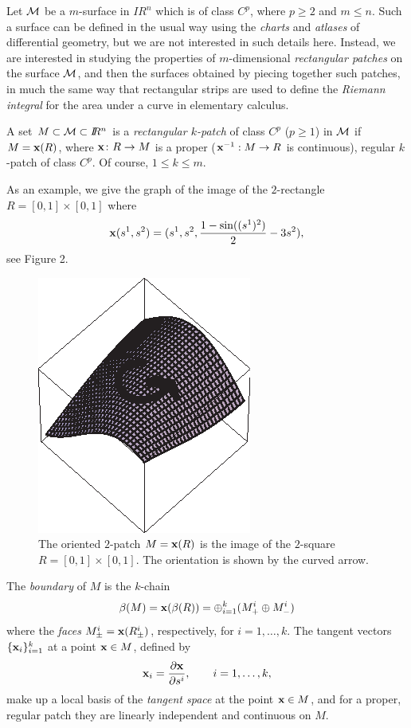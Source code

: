 \documentclass[12]{article}
\def\no{\noindent}
\def\bx{{\bf x}}
\def\R{I\!\!R}
\def\no{\noindent}
\def\no{\noindent}
\def\no{\noindent}
\def\d{\partial}
\def \xx {{\bf x}}
\begin{document}
Let $\cal M$ be a $m$-surface in $\R^n$ which is of class $C^p$, where $p\ge 2$ and $m\le n$.
Such a surface can be defined in the usual way using the
{\it charts} and {\it atlases} of differential geometry, but we are not interested in such details here.
Instead, we are interested in studying the properties of $m$-dimensional {\it rectangular patches} on
the surface $\cal M$, and then the surfaces obtained by piecing together such patches, in much the
same way that rectangular strips are used to define the {\it Riemann integral} for the
area under a curve in elementary
calculus.

\bigskip

\no {\bf Definition}
A set $M\subset {\cal M}\subset \R^n$ is a {\it rectangular $k$-patch} of class $C^p$ ($p\geq 1$) in $\cal M$ 
if $M=\xx(R)$, where $\xx\colon R\to  M$ is a proper ($\xx^{-1}:M \to R$ is continuous),
 regular $k$-patch of class $C^p$. Of course, $1\le k\le m$.

\bigskip

As an example, we give the graph of the image of the $2$-rectangle $R=[0,1]\times [0,1]$ where 
\[ \bx(s^1,s^2)=(s^1,s^2,\frac{1- \sin((s^1)^2)}{2}-3s^2), \] 
see Figure 2.

\begin{figure}
\begin{center}
\includegraphics[scale=1.40]{fig2c.eps}%
\caption{The oriented $2$-patch $M=\bx(R)$ is the image of the $2$-square $R=[0,1]\times [0,1]$. The
orientation is shown by the curved arrow.}
\end{center}
\end{figure} 

The {\it boundary} of $M$ is the $k$-chain 
\begin{displaymath}
\beta(M) =\xx(\beta(R))= \oplus_{i=1}^k (M^i_+ \oplus M^i_-)
\end{displaymath}
where the {\it faces} $M^i_\pm=\xx(R^i_\pm)$, respectively, for $i=1,\dots,k$. 
The tangent vectors $\{\xx_i\}_{i=1}^k$ at a point $\bx\in M$, defined by
\begin{equation}
\xx_i=\frac{\d \xx}{\d s^i}, \qquad i=1,\dots,k,
\end{equation}
make up a local basis of the {\it tangent space} at the point $\bx\in M$, 
and for a proper, regular patch they are linearly independent and continuous on $M$.
\end{document}

